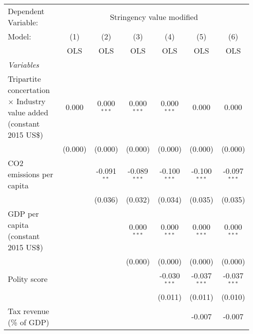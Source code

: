 
\begingroup
\centering
\begin{tabular}{lcccccc}
   \toprule
   Dependent Variable: & \multicolumn{6}{c}{Stringency value modified}\\
   Model:                                                                       & (1)     & (2)           & (3)            & (4)            & (5)            & (6)\\  
                                                                                &  OLS    & OLS           & OLS            & OLS            & OLS            & OLS\\  
   \midrule
   \emph{Variables}\\
   Tripartite concertation $\times$ Industry value added (constant 2015 US\$)   & 0.000   & 0.000$^{***}$ & 0.000$^{***}$  & 0.000$^{***}$  & 0.000          & 0.000\\   
                                                                                & (0.000) & (0.000)       & (0.000)        & (0.000)        & (0.000)        & (0.000)\\   
   CO2 emissions per capita                                                     &         & -0.091$^{**}$ & -0.089$^{***}$ & -0.100$^{***}$ & -0.100$^{***}$ & -0.097$^{***}$\\   
                                                                                &         & (0.036)       & (0.032)        & (0.034)        & (0.035)        & (0.035)\\   
   GDP per capita (constant 2015 US\$)                                          &         &               & 0.000$^{***}$  & 0.000$^{***}$  & 0.000$^{***}$  & 0.000$^{***}$\\   
                                                                                &         &               & (0.000)        & (0.000)        & (0.000)        & (0.000)\\   
   Polity score                                                                 &         &               &                & -0.030$^{***}$ & -0.037$^{***}$ & -0.037$^{***}$\\   
                                                                                &         &               &                & (0.011)        & (0.011)        & (0.010)\\   
   Tax revenue (\% of GDP)                                                      &         &               &                &                & -0.007         & -0.007\\   

\end{tabular}
